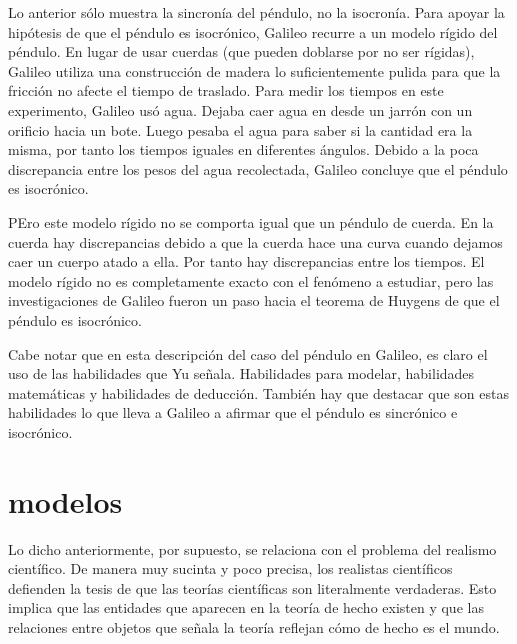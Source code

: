 Lo anterior sólo muestra la sincronía del péndulo, no la isocronía. Para apoyar la hipótesis de que el péndulo es isocrónico, Galileo recurre a un modelo rígido del péndulo. En lugar de usar cuerdas (que pueden doblarse por no ser rígidas), Galileo utiliza una construcción de madera lo suficientemente pulida para que la fricción no afecte el tiempo de traslado. Para medir los tiempos en este experimento, Galileo usó agua. Dejaba caer agua en desde un jarrón con un orificio hacia un bote. Luego pesaba el agua para saber si la cantidad era la misma, por tanto los tiempos iguales en diferentes ángulos. Debido a la poca discrepancia entre los pesos del agua recolectada, Galileo concluye que el péndulo es isocrónico.

PEro este modelo rígido no se comporta igual que un péndulo de cuerda. En la cuerda hay discrepancias debido a que la cuerda hace una curva cuando dejamos caer un cuerpo atado a ella. Por tanto hay discrepancias entre los tiempos. El modelo rígido no es completamente exacto con el fenómeno a estudiar, pero las investigaciones de Galileo fueron un paso hacia el teorema de Huygens de que el péndulo es isocrónico. 

Cabe notar que en esta descripción del caso del péndulo en Galileo, es claro el uso de las habilidades que Yu señala. Habilidades para modelar, habilidades matemáticas y habilidades de deducción. También hay que destacar que son estas habilidades lo que lleva a Galileo a afirmar que el péndulo es sincrónico e isocrónico. 










\section{modelos}



















Lo dicho anteriormente, por supuesto, se relaciona con el problema del realismo científico. De manera muy sucinta y poco precisa, los realistas científicos defienden la tesis de que las teorías científicas son literalmente verdaderas. Esto implica que las entidades que aparecen en la teoría de hecho existen y que las relaciones entre objetos que señala la teoría reflejan cómo de hecho es el mundo.

